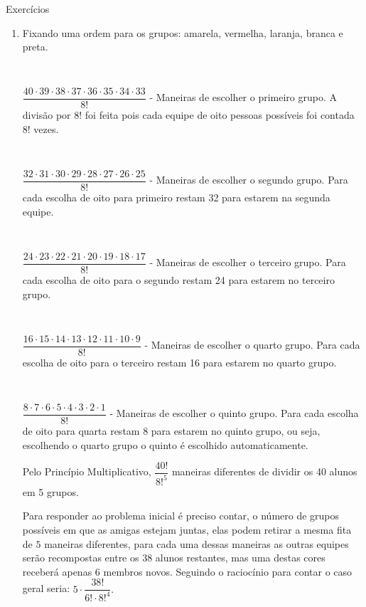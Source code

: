 \begin{answer}{Exercícios}
{\begin{enumerate}
Este problema também poderia ser solucionado contando todos os possíveis uniformes que seriam: $3\cdot 4 =12$ e retirando a única opção que é a camiseta amarela com bermuda amarela. 

Como o número de elementos envolvidos neste problema ainda é pequeno, é provável que alguns estudantes decidam por listar todos os casos. 

\columnbreak
\item Fixando uma ordem para os grupos: amarela, vermelha, laranja, branca e preta.

~~

$\dfrac{40 \cdot 39 \cdot 38 \cdot 37 \cdot 36 \cdot 35 \cdot 34 \cdot 33}{8!}$ - Maneiras de escolher o primeiro grupo. A divisão por $8!$ foi feita pois cada equipe de oito pessoas possíveis foi contada $8!$ vezes.  

~~


$\dfrac{32 \cdot 31 \cdot 30 \cdot 29 \cdot 28 \cdot 27 \cdot 26 \cdot 25}{8!}$ - Maneiras de escolher o segundo grupo. Para cada escolha de oito para primeiro restam 32 para estarem na segunda equipe. 

~~


$\dfrac{24 \cdot 23 \cdot 22 \cdot 21 \cdot 20 \cdot 19 \cdot 18 \cdot 17}{8!}$ - Maneiras de escolher o terceiro grupo. Para cada escolha de oito para o segundo restam 24 para estarem no terceiro grupo. 

~~


$\dfrac{16 \cdot 15 \cdot 14 \cdot 13 \cdot 12 \cdot 11 \cdot 10 \cdot 9}{8!}$ - Maneiras de escolher o quarto grupo. Para cada escolha de oito para o terceiro restam 16 para estarem no quarto grupo. 

~~

$\dfrac{8 \cdot 7 \cdot 6 \cdot 5 \cdot 4 \cdot 3 \cdot 2 \cdot 1}{8!}$ - Maneiras de escolher o quinto grupo. Para cada escolha de oito para quarta restam 8 para estarem no quinto grupo, ou seja, escolhendo o quarto grupo o quinto é escolhido automaticamente.

Pelo Princípio Multiplicativo,  $\dfrac{40!}{8!^5}$ maneiras diferentes de dividir os 40 alunos em 5 grupos. 

Para responder ao problema inicial é preciso contar, o número de grupos possíveis em que as amigas estejam juntas, elas podem retirar a mesma fita de $5$ maneiras diferentes, para cada uma dessas maneiras as outras equipes serão recompostas entre os $38$ alunos restantes, mas uma destas cores receberá apenas $6$ membros novos. Seguindo o raciocínio para contar o caso geral seria: $ 5 \cdot \dfrac{38!}{6!\cdot 8!^4}.$


\end{enumerate}}
\end{answer}
